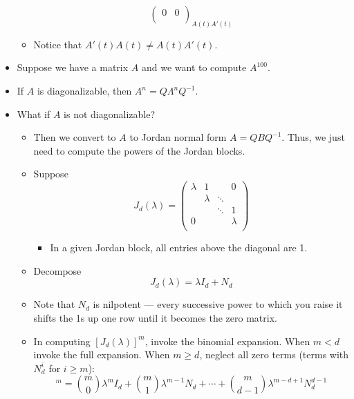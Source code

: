 \documentclass[../notes.tex]{subfiles}
\begin{document}
\begin{itemize}
\begin{itemize}
\begin{equation*}
{\begin{pmatrix}
                    0 & 0\\
                \end{pmatrix}
            }_{A(t)A'(t)}
        \end{equation*}
        \item Notice that $A'(t)A(t)\neq A(t)A'(t)$.
    \end{itemize}
    \item Suppose we have a matrix $A$ and we want to compute $A^{100}$.
    \item If $A$ is diagonalizable, then $A^n=Q\Lambda^nQ^{-1}$.
    \item What if $A$ is not diagonalizable?
    \begin{itemize}
        \item Then we convert to $A$ to Jordan normal form $A=QBQ^{-1}$. Thus, we just need to compute the powers of the Jordan blocks.
        \item Suppose
        \begin{equation*}
            J_d(\lambda) =
            \begin{pmatrix}
                \lambda & 1 &  & 0\\
                 & \lambda & \ddots & \\
                 &  & \ddots & 1\\
                0 &  &  & \lambda\\
            \end{pmatrix}
        \end{equation*}
        \begin{itemize}
            \item In a given Jordan block, all entries above the diagonal are 1.
        \end{itemize}
        \item Decompose
        \begin{equation*}
            J_d(\lambda) = \lambda I_d+N_d
        \end{equation*}
        \item Note that $N_d$ is nilpotent --- every successive power to which you raise it shifts the 1s up one row until it becomes the zero matrix.
        \item In computing $[J_d(\lambda)]^m$, invoke the binomial expansion. When $m<d$ invoke the full expansion. When $m\geq d$, neglect all zero terms (terms with $N_d^i$ for $i\geq m$):
        \begin{equation*}
            [J_d(\lambda)]^m = \binom{m}{0}\lambda^mI_d+\binom{m}{1}\lambda^{m-1}N_d+\cdots+\binom{m}{d-1}\lambda^{m-d+1}N_d^{d-1}

\end{equation*}
\end{itemize}
\end{itemize}
\end{document}
